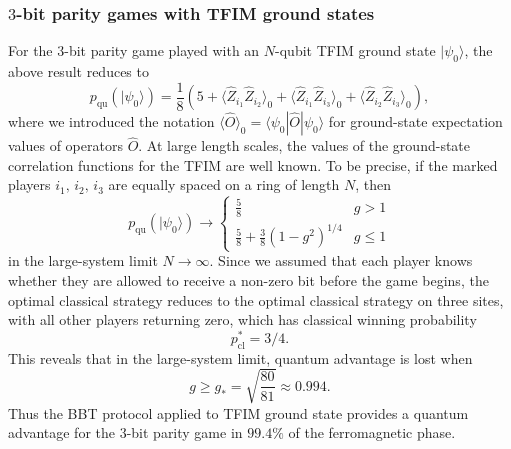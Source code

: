 \documentclass[prb,twocolumn,showpacs,amssymb,superscriptaddress]{revtex4-2}
\begin{document}
\subsubsection{$3$-bit parity games with TFIM ground states}
For the $3$-bit parity game played with an $N$-qubit TFIM ground state $|\psi_0\rangle$, the above result reduces to
\begin{equation}
\label{eq:exact3}
p_{\mathrm{qu}}(|\psi_0\rangle) = \frac{1}{8}\left(5+ \langle \hat{Z}_{i_1}\hat{Z}_{i_2}\rangle_0 + \langle \hat{Z}_{i_1}\hat{Z}_{i_3}\rangle_0 +\langle \hat{Z}_{i_2}\hat{Z}_{i_3} \rangle_0\right),
\end{equation}
where we introduced the notation $\langle \hat{O}\rangle_0 =  \langle \psi_0 | \hat{O}|\psi_0\rangle$ for ground-state expectation values of operators $\hat{O}$. At large length scales, the values of the ground-state correlation functions for the TFIM are well known\cite{pfeuty1970one}. To be precise, if the marked players $i_1,\,i_2,\,i_3$ are equally spaced on a ring of length $N$, then
\begin{equation}
p_{\mathrm{qu}}(|\psi_0\rangle)\to \begin{cases} \frac{5}{8} & g > 1\\ \frac{5}{8}+\frac{3}{8}(1-g^2)^{1/4} & g\leq 1\end{cases}
\end{equation}
in the large-system limit $N \to \infty$. Since we assumed that each player knows whether they are allowed to receive a non-zero bit before the game begins, the optimal classical strategy reduces to the optimal classical strategy on three sites, with all other players returning zero, which has classical winning probability
\begin{equation}
p_{\mathrm{cl}}^* = 3/4.
\end{equation}
This reveals that in the large-system limit, quantum advantage is lost when
\begin{equation}
g \geq g_*=\sqrt{\frac{80}{81}} \approx 0.994.
\end{equation}
Thus the BBT protocol applied to TFIM ground state provides a quantum advantage for the 3-bit parity game in $99.4 \%$ of the ferromagnetic phase.
\end{document}
